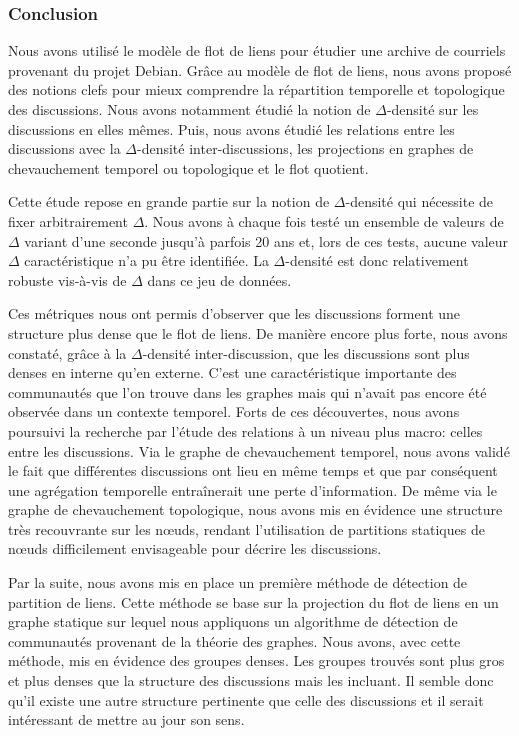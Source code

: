 \subsubsection{Conclusion}

Nous avons utilisé le modèle de flot de liens pour étudier une archive de courriels provenant du projet Debian.
Grâce au modèle de flot de liens, nous avons proposé des notions clefs pour mieux comprendre la répartition temporelle et topologique des discussions.
Nous avons notamment étudié la notion de $\Delta$-densité sur les discussions en elles mêmes.
Puis, nous avons étudié les relations entre les discussions avec la $\Delta$-densité inter-discussions, les projections en graphes de chevauchement temporel ou topologique et le flot quotient.

Cette étude repose en grande partie sur la notion de $\Delta$-densité qui nécessite de fixer arbitrairement $\Delta$.
Nous avons à chaque fois testé un ensemble de valeurs de $\Delta$ variant d'une seconde jusqu'à parfois 20 ans et, lors de ces tests, aucune valeur $\Delta$ caractéristique n'a pu être identifiée.
La $\Delta$-densité est donc relativement robuste vis-à-vis de $\Delta$ dans ce jeu de données.

Ces métriques nous ont permis d'observer que les discussions forment une structure plus dense que le flot de liens.
De manière encore plus forte, nous avons constaté, grâce à la $\Delta$-densité inter-discussion, que les discussions sont plus denses en interne qu'en externe.
C'est une caractéristique importante des communautés que l'on trouve dans les graphes mais qui n'avait pas encore été observée dans un contexte temporel.
Forts de ces découvertes, nous avons poursuivi la recherche par l'étude des relations à un niveau plus macro: celles entre les discussions.
Via le graphe de chevauchement temporel, nous avons validé le fait que différentes discussions ont lieu en même temps et que par conséquent une agrégation temporelle entraînerait une perte d'information.
De même via le graphe de chevauchement topologique, nous avons mis en évidence une structure très recouvrante sur les n\oe{}uds, rendant l'utilisation de partitions statiques de n\oe{}uds difficilement envisageable pour décrire les discussions.


Par la suite, nous avons mis en place un première méthode de détection de partition de liens.
Cette méthode se base sur la projection du flot de liens en un graphe statique sur lequel nous appliquons un algorithme de détection de communautés provenant de la théorie des graphes.
Nous avons, avec cette méthode, mis en évidence des groupes denses.
Les groupes trouvés sont plus gros et plus denses que la structure des discussions mais les incluant.
Il semble donc qu'il existe une autre structure pertinente que celle des discussions et il serait intéressant de mettre au jour son sens.


